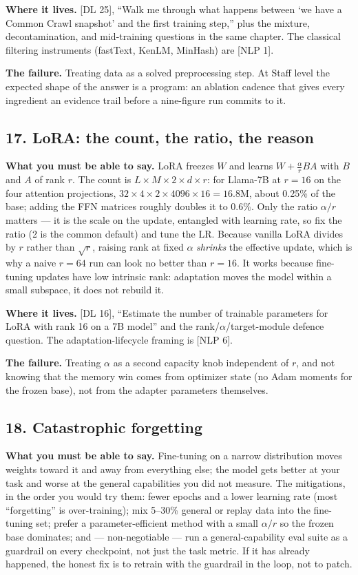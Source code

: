 \textbf{Where it lives.} [DL 25], ``Walk me through what happens between `we have a Common Crawl snapshot' and the first training step,'' plus the mixture, decontamination, and mid-training questions in the same chapter. The classical filtering instruments (fastText, KenLM, MinHash) are [NLP 1].

\textbf{The failure.} Treating data as a solved preprocessing step. At Staff level the expected shape of the answer is a program: an ablation cadence that gives every ingredient an evidence trail before a nine-figure run commits to it.

\subsection*{17. LoRA: the count, the ratio, the reason}

\textbf{What you must be able to say.} LoRA freezes $W$ and learns $W + \frac{\alpha}{r}BA$ with $B$ and $A$ of rank $r$. The count is $L \times M \times 2 \times d \times r$: for Llama-7B at $r = 16$ on the four attention projections, $32 \times 4 \times 2 \times 4096 \times 16 = 16.8$M, about 0.25\% of the base; adding the FFN matrices roughly doubles it to 0.6\%. Only the ratio $\alpha/r$ matters --- it is the scale on the update, entangled with learning rate, so fix the ratio (2 is the common default) and tune the LR. Because vanilla LoRA divides by $r$ rather than $\sqrt{r}$, raising rank at fixed $\alpha$ \emph{shrinks} the effective update, which is why a naive $r = 64$ run can look no better than $r = 16$. It works because fine-tuning updates have low intrinsic rank: adaptation moves the model within a small subspace, it does not rebuild it.

\textbf{Where it lives.} [DL 16], ``Estimate the number of trainable parameters for LoRA with rank 16 on a 7B model'' and the rank/$\alpha$/target-module defence question. The adaptation-lifecycle framing is [NLP 6].

\textbf{The failure.} Treating $\alpha$ as a second capacity knob independent of $r$, and not knowing that the memory win comes from optimizer state (no Adam moments for the frozen base), not from the adapter parameters themselves.

\subsection*{18. Catastrophic forgetting}

\textbf{What you must be able to say.} Fine-tuning on a narrow distribution moves weights toward it and away from everything else; the model gets better at your task and worse at the general capabilities you did not measure. The mitigations, in the order you would try them: fewer epochs and a lower learning rate (most ``forgetting'' is over-training); mix 5--30\% general or replay data into the fine-tuning set; prefer a parameter-efficient method with a small $\alpha/r$ so the frozen base dominates; and --- non-negotiable --- run a general-capability eval suite as a guardrail on every checkpoint, not just the task metric. If it has already happened, the honest fix is to retrain with the guardrail in the loop, not to patch.

